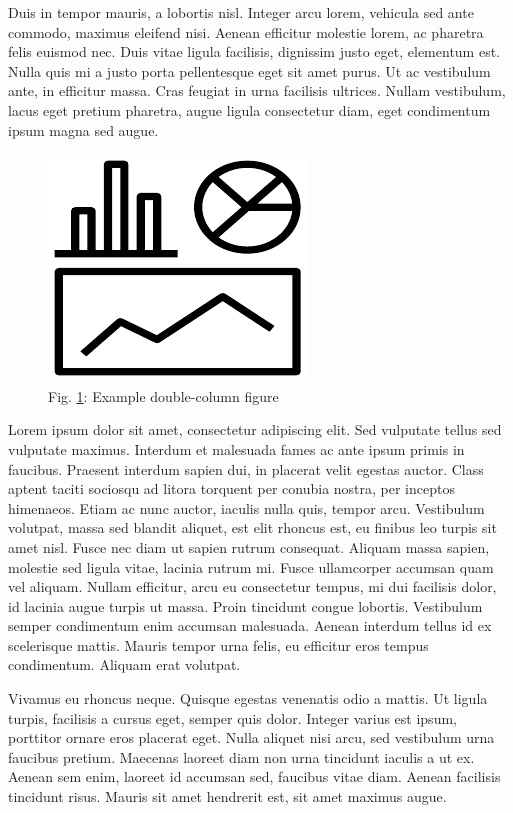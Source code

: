 \documentclass[10pt]{article}
\begin{document}
Duis in tempor mauris, a lobortis nisl. Integer arcu lorem, vehicula sed
ante commodo, maximus eleifend nisi. Aenean efficitur molestie lorem, ac
pharetra felis euismod nec. Duis vitae ligula facilisis, dignissim justo
eget, elementum est. Nulla quis mi a justo porta pellentesque eget sit
amet purus. Ut ac vestibulum ante, in efficitur massa. Cras feugiat in
urna facilisis ultrices. Nullam vestibulum, lacus eget pretium pharetra,
augue ligula consectetur diam, eget condimentum ipsum magna sed augue.

\setlength{\intextsep}{2pt}\setlength{\columnsep}{8pt}\begin{figure}[t]\centering\includegraphics{fig/example_figure.pdf}\caption{\label{fig3}Fig.
\ref{fig3}: Example double-column figure}\vspace{-5pt}\end{figure}

Lorem ipsum dolor sit amet, consectetur adipiscing elit. Sed vulputate
tellus sed vulputate maximus. Interdum et malesuada fames ac ante ipsum
primis in faucibus. Praesent interdum sapien dui, in placerat velit
egestas auctor. Class aptent taciti sociosqu ad litora torquent per
conubia nostra, per inceptos himenaeos. Etiam ac nunc auctor, iaculis
nulla quis, tempor arcu. Vestibulum volutpat, massa sed blandit aliquet,
est elit rhoncus est, eu finibus leo turpis sit amet nisl. Fusce nec
diam ut sapien rutrum consequat. Aliquam massa sapien, molestie sed
ligula vitae, lacinia rutrum mi. Fusce ullamcorper accumsan quam vel
aliquam. Nullam efficitur, arcu eu consectetur tempus, mi dui facilisis
dolor, id lacinia augue turpis ut massa. Proin tincidunt congue
lobortis. Vestibulum semper condimentum enim accumsan malesuada. Aenean
interdum tellus id ex scelerisque mattis. Mauris tempor urna felis, eu
efficitur eros tempus condimentum. Aliquam erat volutpat.

Vivamus eu rhoncus neque. Quisque egestas venenatis odio a mattis. Ut
ligula turpis, facilisis a cursus eget, semper quis dolor. Integer
varius est ipsum, porttitor ornare eros placerat eget. Nulla aliquet
nisi arcu, sed vestibulum urna faucibus pretium. Maecenas laoreet diam
non urna tincidunt iaculis a ut ex. Aenean sem enim, laoreet id accumsan
sed, faucibus vitae diam. Aenean facilisis tincidunt risus. Mauris sit
amet hendrerit est, sit amet maximus augue.
\end{document}
